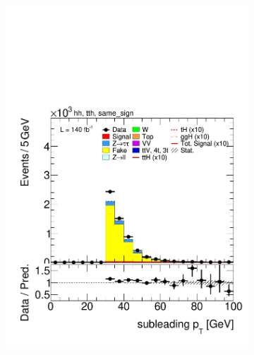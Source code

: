 \begin{figure}[htbp]
    \begin{subfigure}[b]{0.45\textwidth}
      \centering
      \includegraphics[width=\textwidth]{images/fakes_run2/plot_tau_1_pt_hh_tth_15_16_17_18_same_sign.pdf}
      \caption{}
    \end{subfigure}
    \hfill
    \begin{subfigure}[b]{0.45\textwidth}
      \centering

\end{subfigure}
\end{figure}
